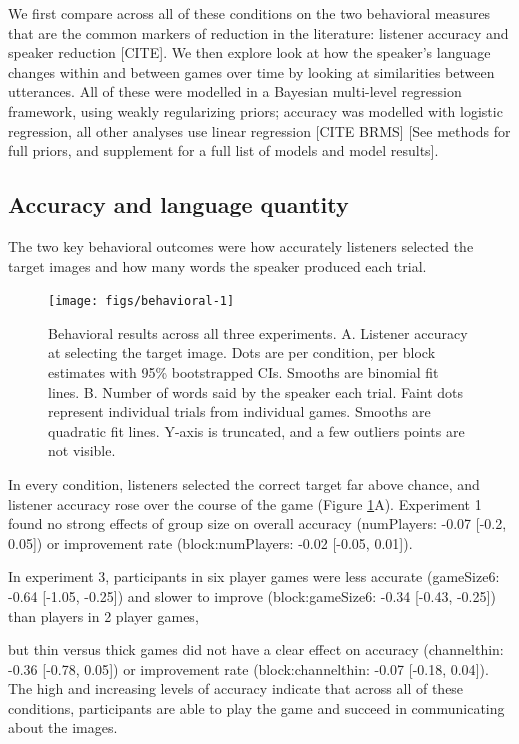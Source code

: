 \documentclass[
  english,
  a4paper,
]{article}
\begin{document}
We first compare across all of these conditions on the two behavioral measures that are the common markers of reduction in the literature: listener accuracy and speaker reduction {[}CITE{]}. We then explore look at how the speaker's language changes within and between games over time by looking at similarities between utterances. All of these were modelled in a Bayesian multi-level regression framework, using weakly regularizing priors; accuracy was modelled with logistic regression, all other analyses use linear regression {[}CITE BRMS{]} {[}See methods for full priors, and supplement for a full list of models and model results{]}.

\hypertarget{accuracy-and-language-quantity}{%
\subsection{Accuracy and language quantity}\label{accuracy-and-language-quantity}}

The two key behavioral outcomes were how accurately listeners selected the target images and how many words the speaker produced each trial.

\begin{figure}[t!]

{\centering \texttt{[image: figs/behavioral-1]} 

}

\caption{Behavioral results across all three experiments. A. Listener accuracy at selecting the target image. Dots are per condition, per block estimates with 95\% bootstrapped CIs. Smooths are binomial fit lines. B. Number of words said by the speaker each trial. Faint dots represent individual trials from individual games. Smooths are quadratic fit lines. Y-axis is truncated, and a few outliers points are not visible. }\label{fig:behavioral}
\end{figure}

In every condition, listeners selected the correct target far above chance, and listener accuracy rose over the course of the game (Figure \ref{fig:behavioral}A). Experiment 1 found no strong effects of group size on overall accuracy (numPlayers: -0.07 {[}-0.2, 0.05{]}) or improvement rate (block:numPlayers: -0.02 {[}-0.05, 0.01{]}).

In experiment 3, participants in six player games were less accurate (gameSize6: -0.64 {[}-1.05, -0.25{]}) and slower to improve (block:gameSize6: -0.34 {[}-0.43, -0.25{]}) than players in 2 player games,

but thin versus thick games did not have a clear effect on accuracy (channelthin: -0.36 {[}-0.78, 0.05{]}) or improvement rate (block:channelthin: -0.07 {[}-0.18, 0.04{]}). The high and increasing levels of accuracy indicate that across all of these conditions, participants are able to play the game and succeed in communicating about the images.
\end{document}
